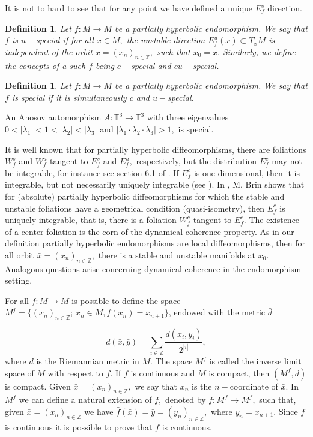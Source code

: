 \documentclass[12pt,reqno]{amsart}
\numberwithin{equation}{section}
\theoremstyle{plain}
\newcommand{\Z}{\mathbb{Z}}
\newtheorem{definition}[theorem]{Definition}
\theoremstyle{remark}
\begin{document}
It is not to hard to see that for any point we have defined a unique $E^s_f$ direction.
\begin{definition}
Let $f:M\rightarrow M$ be a partially hyperbolic endomorphism. We say that $f$ is $u-$special if for all $x\in M,$ the unstable direction $E^u_f(x)\subset T_xM$ is independent of the orbit $\bar{x} = (x_n)_{n \in \mathbb{Z}},$ such that $x_0 = x.$ Similarly, we define the concepts of a such $f$ being $c-$special and $cu-$special.
\end{definition}

\begin{definition}
Let $f:M\rightarrow M$ be a partially hyperbolic endomorphism. We say that $f$ is special if it is simultaneously $c$ and $u-$special.
\end{definition}

An Anosov automorphism $A: \mathbb{T}^3 \rightarrow \mathbb{T}^3$ with three eigenvalues $0 <  |\lambda_1| < 1 <  |\lambda_2| < |\lambda_3| $ and $|\lambda_1 \cdot \lambda_2 \cdot \lambda_3 | > 1,$ is special.



It is well known that for partially hyperbolic diffeomorphisms,
there are foliations $W^s_f$ and $W^u_f$ tangent to $E^s_f$ and $E^u_f,$ respectively, but the distribution $E^c_f$ may not be integrable, for instance see section 6.1 of \cite{pesin2004lectures}.
If $E^c_f$ is  one-dimensional, then it is integrable, but not necessarily uniquely integrable (see \cite{HHU2}). In \cite{B},  M. Brin shows that for (absolute) partially hyperbolic diffeomorphisms for which the stable and unstable foliations have a geometrical condition (quasi-isometry), then $E^c_f$ is uniquely integrable, that is, there
is a foliation $W^c_f$ tangent to $E^c_f.$ The existence of a center foliation is the corn of the dynamical coherence property. As in our definition partially hyperbolic endomorphisms are local diffeomorphisms, then for all orbit $\bar{x} = (x_n)_{n \in \mathbb{Z}},$ there is a stable and unstable manifolds at $x_0.$ Analogous questions arise concerning dynamical coherence in the endomorphism setting.

For all $f: M \rightarrow M$  is  possible to define the space \mbox{$M^f=\{(x_n)_{n \in \mathbb{Z}};\, x_n\in M, f(x_n)=x_{n+1}\}$}, endowed with the metric $\bar{d}$

$$
\bar{d}(\bar{x},\bar{y})=\displaystyle\sum_{i\in {\Z}}\frac{d(x_i,y_i)}{2^{|i|}},
$$
where $d$ is the Riemannian metric in $M$. The space $M^f$ is called the inverse limit space of $M$ with respect to $f.$  If $f$ is  continuous and $M$ is compact, then $(M^f, \bar{d})$ is compact. Given $\bar{x} = (x_n)_{n \in \Z},$ we say that $x_n$ is the $n-$coordinate of $\bar{x} .$ In $M^f$ we can define a natural extension of $f,$ denoted by $\bar{f}:M^f \rightarrow M^f, $ such that, given $\bar{x} = (x_n)_{n \in \Z}$ we have $\bar{f}(\bar{x}) = \bar{y} = (y_n)_{n \in \Z},$ where $y_{n} = x_{n+1}.$ Since $f$ is continuous it is possible to prove that $\bar{f}$ is continuous.
\end{document}
